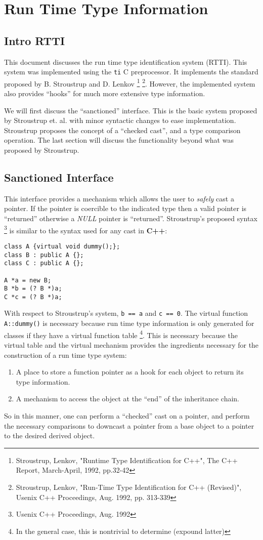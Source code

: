 \chapter{Run Time Type Information}

\section{Intro RTTI}

This document discusses the run time type identification system (RTTI). This 
system was implemented using the {\tt ti} C preprocessor. It 
implements the standard proposed by B. Stroustrup and D. Lenkov 
\footnote{Stroustrup, Lenkov, "Runtime Type Identification for C++", The C++ 
Report, March-April, 1992, pp.32-42} \footnote{Stroustrup, Lenkov, "Run-Time 
Type Identification for C++ (Revised)", Usenix C++ Proceedings, Aug. 1992, 
pp. 313-339}. However, the implemented system also provides ``hooks'' for much 
more extensive type information.

We will first discuss the ``sanctioned'' interface. This is the basic system
proposed by Stroustrup et. al. with minor syntactic changes to ease 
implementation. Stroustrup proposes the concept of a ``checked cast'', and
a type comparison operation. The last section will discuss the functionality
beyond what was proposed by Stroustrup.

\section{Sanctioned Interface}

This interface provides a mechanism which allows the user to {\em safely} cast
a pointer. If the pointer is coercible to the indicated type then a valid
pointer is ``returned'' otherwise a {\em NULL} pointer is ``returned''.
Stroustrup's proposed syntax \footnote{Usenix C++ Proceedings, Aug. 1992} is 
similar to the syntax used for any cast in {\bf C++}:
\begin{verbatim}
class A {virtual void dummy();};
class B : public A {};
class C : public A {};

A *a = new B;
B *b = (? B *)a;
C *c = (? B *)a;
\end{verbatim}
\noindent
With respect to Stroustrup's system, {\tt b == a} and {\tt c == 0}. The
virtual function {\tt A::dummy()} is necessary because run time type 
information is only generated for classes if they have a virtual function 
table \footnote{In the general case, this is nontrivial to determine (expound
latter)}. This is necessary because the virtual table and the virtual 
mechanism provides the ingredients necessary for the construction of a 
run time type system:
\begin{enumerate}
\item
A place to store a function pointer as a hook for each object to return
its type information.
\item
A mechanism to access the object at the ``end'' of the inheritance chain.
\end{enumerate}
\noindent
So in this manner, one can perform a ``checked'' cast on a pointer, and
perform the necessary comparisons to downcast a pointer from a base object
to a pointer to the desired derived object.

